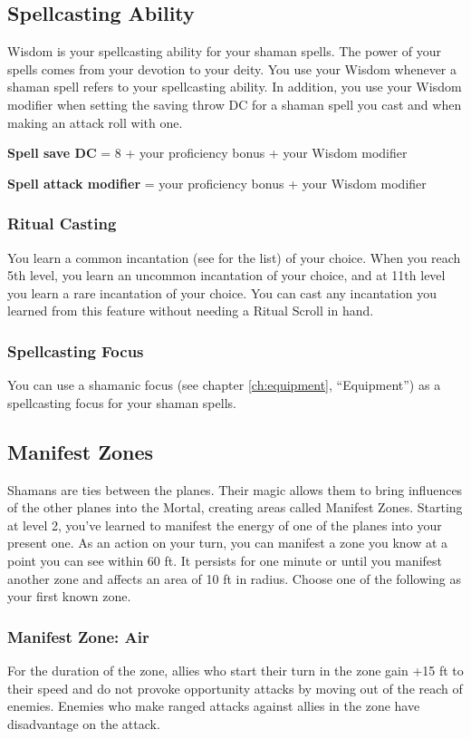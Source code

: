 \subsection{Spellcasting Ability}

Wisdom is your spellcasting ability for your shaman spells. The power of your spells comes from your devotion to your deity. You use your Wisdom whenever a shaman spell refers to your spellcasting ability. In addition, you use your Wisdom modifier when setting the saving throw DC for a shaman spell you cast and when making an attack roll with one.

\textbf{Spell save DC} = 8 + your proficiency bonus + your Wisdom modifier

\textbf{Spell attack modifier} = your proficiency bonus + your Wisdom modifier

\subsubsection{Ritual Casting}

You learn a common incantation (see  for the list) of your choice. When you reach 5th level, you learn an uncommon incantation of your choice, and at 11th level you learn a rare incantation of your choice. You can cast any incantation you learned from this feature without needing a Ritual Scroll in hand.

\subsubsection{Spellcasting Focus}

You can use a shamanic focus (see chapter \ref{ch:equipment}, “Equipment”) as a spellcasting focus for your shaman spells.

\subsection{Manifest Zones}
Shamans are ties between the planes. Their magic allows them to bring influences of the other planes into the Mortal, creating areas called Manifest Zones. Starting at level 2, you've learned to manifest the energy of one of the planes into your present one. As an action on your turn, you can manifest a zone you know at a point you can see within 60 ft. It persists for one minute or until you manifest another zone and affects an area of 10 ft in radius. Choose one of the following as your first known zone.
\subsubsection{Manifest Zone: Air}
For the duration of the zone, allies who start their turn in the zone gain +15 ft to their speed and do not provoke opportunity attacks by moving out of the reach of enemies. Enemies who make ranged attacks against allies in the zone have disadvantage on the attack.
